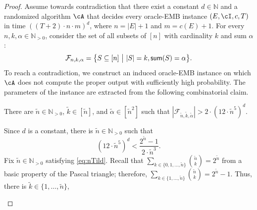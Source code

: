 \thmemb*
	\begin{proof}
		Assume towards contradiction that there exist a constant $d \in \mathbb{N}$ and a randomized algorithm $\cA$ that decides every oracle-EMB instance $(E,\cI,c,T)$ in time $\left( (T+2) \cdot n \cdot m \right)^{d}$, where $n = |E|+1$ and $m = c(E)+1$.  
		For every $n,k,\alpha \in \mathbb{N}_{>0}$, consider the set of all subsets of $[n]$ with cardinality $k$ and sum $\alpha$: $$\mathcal{F}_{n,k,\alpha} = \big\{S \subseteq [n]~\big|~|S| = k, \textnormal{\textsf{sum}}(S) = \alpha\big\}.$$ 
		To reach a contradiction, we construct an induced oracle-EMB instance on which $\cA$ does not compute the proper output with sufficiently high probability. The parameters of the instance are extracted from the following combinatorial claim. 
			\begin{claim}
			\label{claim:H1}
			There are $\tilde{n} \in \mathbb{N}_{>0}$, $\tilde{k} \in \left[\tilde{n}\right]$, and $\tilde{\alpha} \in \left[\tilde{n}^2\right]$ such that 
$|\mathcal{F}_{\tilde{n},\tilde{k},\tilde{\alpha}}|> 	2 \cdot \left(	12 \cdot \tilde{n}^5 \right)^{d} $. 
		\end{claim}
		\begin{claimproof}
				Since $d$ is a constant, %
				there is $\tilde{n} \in \mathbb{N}_{>0}$ such that 
				\begin{equation}
					\label{eq:nTild}
						\left(	12 \cdot \tilde{n}^5 \right)^{d} < \frac{2^{\tilde{n}}-1}{2 \cdot \tilde{n}^3}.
				\end{equation}
				  Fix $\tilde{n} \in \mathbb{N}_{>0}$ satisfying \eqref{eq:nTild}. Recall that $\sum_{k \in \{0,1,\ldots,\tilde{n}\}} {\tilde{n} \choose k} = 2^{\tilde{n}}$ from a basic property of the Pascal triangle; therefore, $\sum_{k \in \{1,\ldots,\tilde{n}\}} {\tilde{n} \choose k} = 2^{\tilde{n}}-1$. Thus, there is  $\tilde{k} \in \{1,\ldots,\tilde{n}\}$, 

\end{claimproof}
\end{proof}
